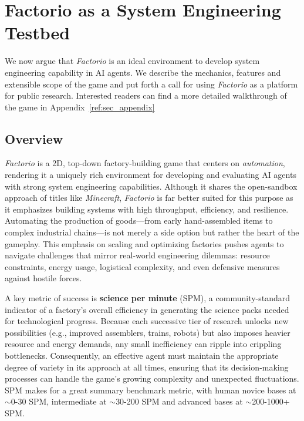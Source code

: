 

\section{Factorio as a System Engineering Testbed}
We now argue that \textit{Factorio} is an ideal environment to develop system engineering capability in AI agents. We describe the mechanics, features and extensible scope of the game and put forth a call for using \textit{Factorio} as a platform for public research. Interested readers can find a more detailed walkthrough of the game in Appendix~\ref{ref:sec_appendix}

\subsection{Overview}
\textit{Factorio} is a 2D, top-down factory-building game that centers on \textit{automation}, rendering it a uniquely rich environment for developing and evaluating AI agents with strong system engineering capabilities. Although it shares the open-sandbox approach of titles like \textit{Minecraft}, \textit{Factorio} is far better suited for this purpose as it emphasizes building systems with high throughput, efficiency, and resilience. Automating the production of goods—from early hand-assembled items to complex industrial chains—is not merely a side option but rather the heart of the gameplay. This emphasis on scaling and optimizing factories pushes agents to navigate challenges that mirror real-world engineering dilemmas: resource constraints, energy usage, logistical complexity, and even defensive measures against hostile forces.

A key metric of success is \textbf{science per minute} (SPM), a community-standard indicator of a factory’s overall efficiency in generating the science packs needed for technological progress. Because each successive tier of research unlocks new possibilities (e.g., improved assemblers, trains, robots) but also imposes heavier resource and energy demands, any small inefficiency can ripple into crippling bottlenecks. Consequently, an effective agent must maintain the appropriate degree of variety in its approach at all times, ensuring that its decision-making processes can handle the game’s growing complexity and unexpected fluctuations. SPM makes for a great summary benchmark metric, with human novice bases at $\sim$0-30 SPM, intermediate at $\sim$30-200 SPM and advanced bases at $\sim$200-1000+ SPM. 

